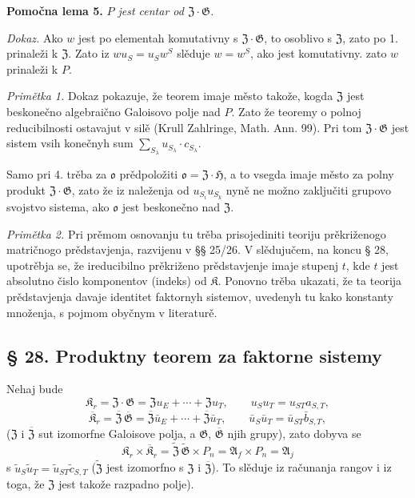 \documentclass[11pt]{article}
\begin{document}
\noindent\textbf{Pomočna lema 5.} \emph{\(P\) jest centar od \(\mathfrak Z\cdot\mathfrak G\).}

\noindent\emph{Dokaz.} Ako \(w\) jest po elementah komutativny s \(\mathfrak Z\cdot\mathfrak G\), to osoblivo s \(\mathfrak Z\), zato po 1. prinaleži k \(\mathfrak Z\). Zato iz \(wu_S=u_Sw^S\) slěduje \(w=w^S\), ako jest komutativny. zato \(w\) prinaleži k \(P\).

\noindent\emph{Primětka 1.} Dokaz pokazuje, že teorem imaje město takože, kogda \(\mathfrak Z\) jest beskonečno algebraično Galoisovo polje nad \(P\). Zato že teoremy o polnoj reducibilnosti ostavajut v silě (Krull Zahlringe, Math. Ann. 99). Pri tom \(\mathfrak Z\cdot\mathfrak G\) jest sistem vsih konečnyh sum \(\sum_{S_\lambda}u_{S_\lambda}\cdot c_{S_\lambda}\).

Samo pri 4. trěba za \(\mathfrak o\) prědpoložiti \(\mathfrak o=\mathfrak Z\cdot\mathfrak H\), a to vsegda imaje město za polny produkt \(\mathfrak Z\cdot\mathfrak G\), zato že iz naleženja od \(u_{S_i}u_{S_k}\) nyně ne možno zaključiti grupovo svojstvo sistema, ako \(\mathfrak o\) jest beskonečno nad \(\mathfrak Z\).

\noindent\emph{Primětka 2.} Pri prěmom osnovanju tu trěba prisojediniti teoriju prěkriženogo matričnogo prědstavjenja, razvijenu v §§ 25/26. V slědujučem, na koncu § 28, upotrěbja se, že ireducibilno prěkriženo prědstavjenje imaje stupenj \(t\), kde \(t\) jest absolutno čislo komponentov (indeks) od \(\mathfrak K\). Ponovno trěba ukazati, že ta teorija prědstavjenja davaje identitet faktornyh sistemov, uvedenyh tu kako konstanty množenja, s pojmom obyčnym v literaturě.

\subsection*{§ 28. Produktny teorem za faktorne sistemy}\label{produktsatz-fuer-faktorensysteme}

Nehaj bude
\[
\mathfrak K_r=\mathfrak Z\cdot\mathfrak G
=\mathfrak Zu_E+\cdots+\mathfrak Zu_T,
\qquad u_Su_T=u_{ST}a_{S,T},
\]
\[
\overline{\mathfrak K}_r
=\overline{\mathfrak Z}\,\overline{\mathfrak G}
=\overline{\mathfrak Z}\bar u_E+\cdots+\overline{\mathfrak Z}\bar u_T,
\qquad
\bar u_S\bar u_T=\bar u_{ST}\bar b_{S,T},
\]
(\(\mathfrak Z\) i \(\overline{\mathfrak Z}\) sut izomorfne Galoisove polja, a \(\mathfrak G\), \(\overline{\mathfrak G}\) njih grupy), zato dobyva se
\[
\mathfrak K_r\times\overline{\mathfrak K}_r
=\widetilde{\mathfrak Z}\,\widetilde{\mathfrak G}\times P_n
=\mathfrak A_f\times P_n
=\mathfrak A_j
\]
s \(\tilde u_S\tilde u_T=\tilde u_{ST}\tilde c_{S,T}\) (\(\widetilde{\mathfrak Z}\) jest izomorfno s \(\mathfrak Z\) i \(\overline{\mathfrak Z}\)). To slěduje iz računanja rangov i iz toga, že \(\mathfrak Z\) jest takože razpadno polje).
\end{document}
